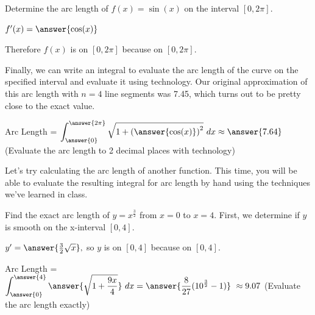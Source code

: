 \documentclass[handout,nooutcomes]{ximera}
\begin{document}
\begin{problem}

Determine the arc length of $f(x) = \sin(x)$ on the interval $[0, 2\pi].$

$f'(x) = \answer{\cos(x)}$

\begin{problem}

Therefore $f(x)$ is  on $[0,2\pi]$ because  on $[0,2\pi]$.

\begin{problem}

Finally, we can write an integral to evaluate the arc length of the curve on the specified interval and evaluate it using technology.  Our original approximation of this arc length with $n=4$ line segments was 7.45, which turns out to be pretty close to the exact value.

Arc Length = $\displaystyle \int_{\answer{0}}^{\answer{2\pi}} \sqrt{1+{\left(\answer{\cos(x)} \right)^2}}\ dx \approx \answer{7.64}$ (Evaluate the arc length to 2 decimal places with technology)


\end{problem}
\end{problem}
\end{problem}

Let's try calculating the arc length of another function.  This time, you will be able to evaluate the resulting integral for arc length by hand using the techniques we've learned in class.


\begin{problem}

Find the exact arc length of $y = x^{\frac{3}{2}}$ from $x=0$ to $x=4$.  First, we determine if $y$ is smooth on the x-interval $[0,4]$.

$y' = \answer{\frac{3}{2}\sqrt{x}},$ so $y$ is  on $[0,4]$ because  on $[0,4]$.

\begin{problem}

Arc Length = $\displaystyle\int_{\answer{0}}^{\answer{4}} \answer{\sqrt{1+\frac{9x}{4}}} \ dx = \answer{\frac{8}{27}(10^{\frac{3}{2}}-1)} \ \approx 9.07$ (Evaluate the arc length exactly)

\end{problem}
\end{problem}
\end{document}
